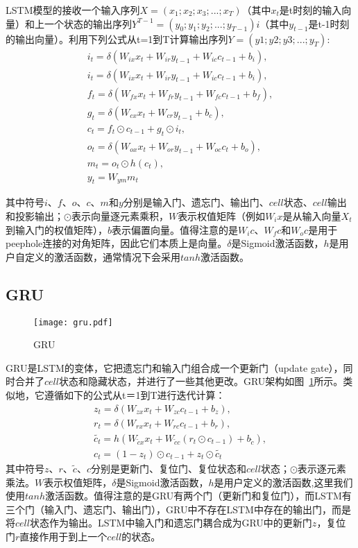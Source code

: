 LSTM模型的接收一个输入序列$X=(x_1;x_2;x_3;...;x_T)$（其中$x_t$是t时刻的输入向量）和上一个状态的输出序列$Y^{T-1}=(y_0;y_1;y_2;...;y_{T-1})i$（其中$y_{t-1}$是t-1时刻的输出向量）。利用下列公式从t=1到T计算输出序列$Y=(y1;y2;y3;...;y_T)$:
\begin{gather}
i_t=\delta (W_{ix}x_t + W_{ir}y_{t-1} + W_{ic}c_{t-1} + b_i), \\
i_t=\delta (W_{ix}x_t + W_{ir}y_{t-1} + W_{ic}c_{t-1} + b_i), \\
f_t=\delta (W_{fx}x_t + W_{fr}y_{t-1} + W_{fc}c_{t-1} + b_f), \\
g_t=\delta (W_{cx}x_t + W_{cr}y_{t-1} + b_c), \\
c_t=f_t \odot c_{t-1} + g_t \odot i_t, \\
o_t=\delta (W_{ox}x_t + W_{or}y_{t-1} + W_{oc}c_{t} + b_o), \\
m_t=o_t \odot h(c_t), \\
y_t=W_{ym}m_t 
\end{gather}

其中符号$i$、$f$、$o$、$c$、$m$和$y$分别是输入门、遗忘门、输出门、$cell$状态、$cell$输出和投影输出；$\odot$表示向量逐元素乘积，$W$表示权值矩阵（例如$W_ix$是从输入向量$X_t$到输入门的权值矩阵），$b$表示偏置向量。值得注意的是$W_ic$、$W_fc$和$W_oc$是用于peephole连接的对角矩阵，因此它们本质上是向量。$\delta$是Sigmoid激活函数，$h$是用户自定义的激活函数，通常情况下会采用$tanh$激活函数。

\subsection{GRU}
\begin{figure}[h]
\centering
\texttt{[image: gru.pdf]}
\caption{\footnotesize GRU}
\label{fig:gru}
\end{figure}
GRU是LSTM的变体，它把遗忘门和输入门组合成一个更新门（update gate），同时合并了$cell$状态和隐藏状态，并进行了一些其他更改。GRU架构如图~\ref{fig:gru}所示。类似地，它遵循如下的公式从t＝1到T进行迭代计算：
\begin{gather}
z_t=\delta(W_{zx}x_t+W_{zc}c_{t-1}+b_z),\\
r_t=\delta(W_{rx}x_t+W_{rc}c_{t-1}+b_r),\\
\tilde{c_t}=h(W_{\tilde{c}x}x_t+W_{\tilde{c}c}(r_t \odot c_{t-1}) + b_{\tilde{c}}),\\
c_t=(1-z_t) \odot c_{t-1} + z_t \odot \tilde{c_t}
\end{gather}
其中符号$z$、$r$、$\tilde{c}$、$c$分别是更新门、复位门、复位状态和$cell$状态；$\odot$表示逐元素乘法。$W$表示权值矩阵，$\delta$是Sigmoid激活函数，$h$是用户定义的激活函数,这里我们使用$tanh$激活函数。值得注意的是GRU有两个门（更新门和复位门），而LSTM有三个门（输入门、遗忘门、输出门），GRU中不存在LSTM中存在的输出门，而是将$cell$状态作为输出。LSTM中输入门和遗忘门耦合成为GRU中的更新门$z$，复位门$r$直接作用于到上一个$cell$的状态。 


